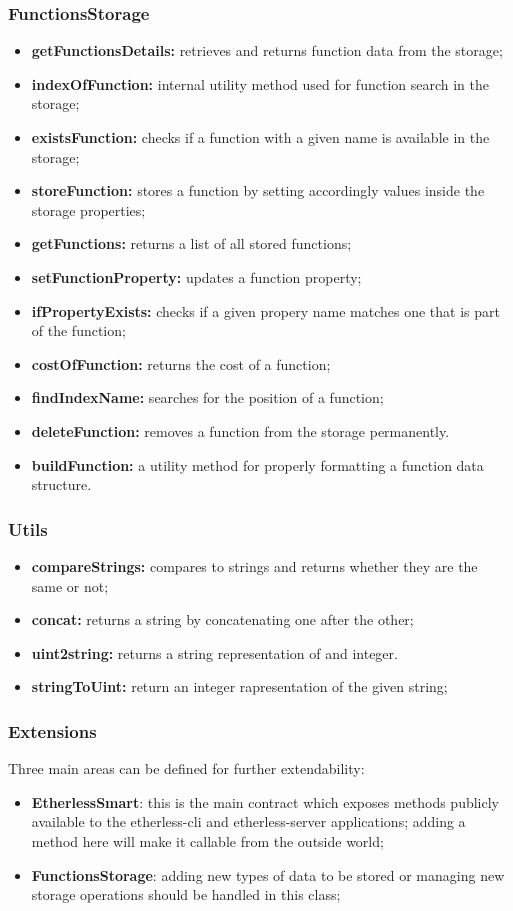 \subsubsection{FunctionsStorage}
\begin{itemize}
	\item \textbf{getFunctionsDetails:} retrieves and returns function data from the storage;
	\item \textbf{indexOfFunction:} internal utility method used for function search in the storage;
	\item \textbf{existsFunction:} checks if a function with a given name is available in the storage;
	\item \textbf{storeFunction:} stores a function by setting accordingly values inside the storage properties;
	\item \textbf{getFunctions:} returns a list of all stored functions;
	\item \textbf{setFunctionProperty:} updates a function property;
	\item \textbf{ifPropertyExists:} checks if a given propery name matches one that is part of the function;
	\item \textbf{costOfFunction:}  returns the cost of a function;
	\item \textbf{findIndexName:} searches for the position of a function;
	\item \textbf{deleteFunction:} removes a function from the storage permanently. 
	\item \textbf{buildFunction:} a utility method for properly formatting a function data structure.
\end{itemize}
\subsubsection{Utils}
\begin{itemize}
	\item \textbf{compareStrings:} compares to strings and returns whether they are the same or not;
	\item \textbf{concat:} returns a string by concatenating one after the other;
	\item \textbf{uint2string:} returns a string representation of and integer.
	\item \textbf{stringToUint:} return an integer rapresentation of the given string;
\end{itemize}
\subsubsection{Extensions}
Three main areas can be defined for further extendability:
\begin{itemize}
	\item \textbf{EtherlessSmart}: this is the main contract which exposes methods publicly available to the etherless-cli and etherless-server applications; adding a method here will make it callable from the outside world;
	\item \textbf{FunctionsStorage}: adding new types of data to be stored or managing new storage operations should be handled in this class;
\end{itemize}



